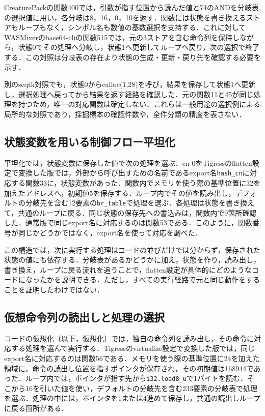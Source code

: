 \documentclass[submit,techrep]{ipsj}
\begin{document}
CreaturePackの関数400では，引数が指す位置から読んだ値と74のANDを分岐表の選択値に用い，各分岐は8，16，0，10を返す．関数には状態を書き換えるストアもループもなく，シンボル名も数値の基数選択を支持する．これに対してWASMixerのbase64-cliの関数515では，元の3ストアを含む命令列を保持しながら，状態0でその処理へ分岐し，状態1へ更新してループへ戻り，次の選択で終了する．この対照は分岐表の存在より状態の生成・更新・戻り先を確認する必要を示す．

別のseqtk対照でも，状態0からcalloc(1,28)を呼び，結果を保存して状態1へ更新し，選択処理へ戻ってから結果を返す経路を確認した．元の関数11と45が同じ処理を持つため，唯一の対応関数は確定しない．これらは一般用途の選択例による局所的な対照であり，採掘標本の確認件数や，全件分類の精度を表さない．

\subsection{状態変数を用いる制御フロー平坦化}
平坦化では，状態変数に保存した値で次の処理を選ぶ．cn-0をTigressのflatten設定で変換した版では，外部から呼び出すための名前であるexport名\texttt{hash\_cn}に対応する関数33に，状態変数があった．関数内でメモリを使う際の基準位置に32を加えたアドレスへ，初期値5を保存する．ループ内でその値を読み出し，デフォルトの分岐先を含む12要素の\texttt{br\_table}で処理を選ぶ．各処理は状態を書き換えて，共通のループに戻る．同じ状態の保存先への書込みは，関数内で9箇所確認した．通常版で同じexport名に対応するのは関数53である．このように，関数番号が同じかどうかではなく，export名を使って対応を調べた．

この構造では，次に実行する処理はコードの並びだけでは分からず，保存された状態の値にも依存する．分岐表があるかどうかに加え，状態を作り，読み出し，書き換え，ループに戻る流れを追うことで，flatten設定が具体的にどのようなコードになったかを説明できる．ただし，すべての実行経路で元と同じ動作をすることを証明したわけではない．

\subsection{仮想命令列の読出しと処理の選択}
コードの仮想化（以下，仮想化）では，独自の命令列を読み出し，その命令に対応する処理を選んで実行する．Tigressのvirtualize設定で変換した版では，同じexport名に対応するのは関数56である．メモリを使う際の基準位置に24を加えた領域に，命令の読出し位置を指すポインタが保存され，その初期値は168944であった．ループ内では，ポインタが指す先から\texttt{i32.load8\_u}で1バイトを読む．そこから16を引いた値を使い，デフォルトの分岐先を含む233要素の分岐表で処理を選ぶ．処理の中には，ポインタを1または4進めて保存し，共通の読出しループに戻る箇所がある．
\end{document}
